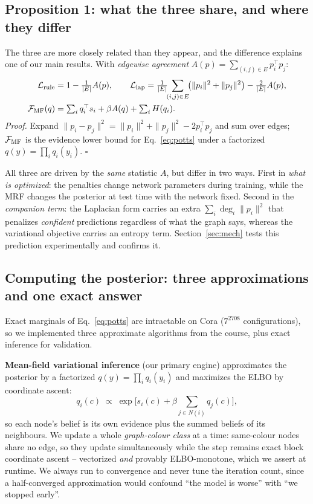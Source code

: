 \documentclass{article}
\begin{document}
\subsection{Proposition 1: what the three share, and where they differ}

The three are more closely related than they appear, and the difference explains one of our main
results. With \emph{edgewise agreement} $A(p)=\sum_{(i,j)\in E}p_i^\top p_j$:
\begin{align}
\mathcal{L}_{\rm rule}&=1-\tfrac{1}{|E|}A(p), \qquad
\mathcal{L}_{\rm lap}=\tfrac{1}{|E|}\!\!\sum_{(i,j)\in E}\!\!\left(\|p_i\|^2+\|p_j\|^2\right)
-\tfrac{2}{|E|}A(p),\\
\mathcal{F}_{\rm MF}(q)&=\textstyle\sum_i q_i^\top s_i+\beta A(q)+\sum_i H(q_i).
\end{align}
\emph{Proof.} Expand $\|p_i-p_j\|^2=\|p_i\|^2+\|p_j\|^2-2p_i^\top p_j$ and sum over edges;
$\mathcal{F}_{\rm MF}$ is the evidence lower bound for Eq.~\ref{eq:potts} under a factorized
$q(y)=\prod_i q_i(y_i)$. $\square$

All three are driven by the \emph{same} statistic $A$, but differ in two ways. First in
\emph{what is optimized}: the penalties change network parameters during training, while the MRF
changes the posterior at test time with the network fixed. Second in the \emph{companion term}:
the Laplacian form carries an extra $\sum_i\deg_i\|p_i\|^2$ that penalizes \emph{confident}
predictions regardless of what the graph says, whereas the variational objective carries an
entropy term. Section~\ref{sec:mech} tests this prediction experimentally and confirms it.

\subsection{Computing the posterior: three approximations and one exact answer}
\label{sec:inference}

Exact marginals of Eq.~\ref{eq:potts} are intractable on Cora ($7^{2708}$ configurations), so we
implemented three approximate algorithms from the course, plus exact inference for validation.

\textbf{Mean-field variational inference} (our primary engine) approximates the posterior by a
factorized $q(y)=\prod_i q_i(y_i)$ and maximizes the ELBO by coordinate ascent:
\begin{equation}
q_i(c)\;\propto\;\exp\Big[s_i(c)+\beta\sum_{j\in N(i)}q_j(c)\Big],
\label{eq:mf}
\end{equation}
so each node's belief is its own evidence plus the summed beliefs of its neighbours. We update a
whole \emph{graph-colour class} at a time: same-colour nodes share no edge, so they update
simultaneously while the step remains exact block coordinate ascent -- vectorized \emph{and}
provably ELBO-monotone, which we assert at runtime. We always run to convergence and never tune
the iteration count, since a half-converged approximation would confound ``the model is worse''
with ``we stopped early''.
\end{document}
